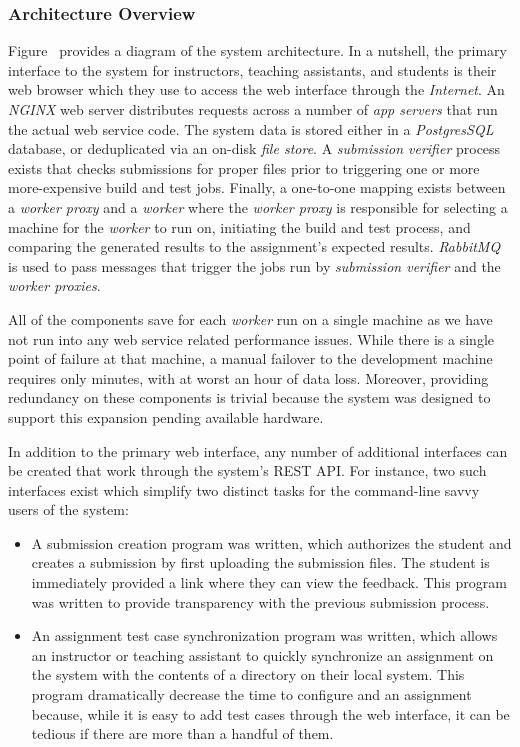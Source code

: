 \subsubsection{Architecture Overview}
Figure~ provides a diagram of the system
architecture. In a nutshell, the primary interface to the system for
instructors, teaching assistants, and students is their web browser which they
use to access the web interface through the \emph{Internet}. An \emph{NGINX}
web server distributes requests across a number of \emph{app servers} that run
the actual web service code. The system data is stored either in a
\emph{PostgresSQL} database, or deduplicated via an on-disk \emph{file
  store}. A \emph{submission verifier} process exists that checks submissions
for proper files prior to triggering one or more more-expensive build and test
jobs. Finally, a one-to-one mapping exists between a \emph{worker proxy} and a
\emph{worker} where the \emph{worker proxy} is responsible for selecting a
machine for the \emph{worker} to run on, initiating the build and test process,
and comparing the generated results to the assignment's expected
results. \emph{RabbitMQ} is used to pass messages that trigger the jobs run by
\emph{submission verifier} and the \emph{worker proxies}.

All of the components save for each \emph{worker} run on a single machine as we
have not run into any web service related performance issues. While there is a
single point of failure at that machine, a manual failover to the development
machine requires only minutes, with at worst an hour of data loss. Moreover,
providing redundancy on these components is trivial because the system was
designed to support this expansion pending available hardware.

In addition to the primary web interface, any number of additional interfaces
can be created that work through the system's REST API. For instance, two such
interfaces exist which simplify two distinct tasks for the command-line savvy
users of the system:

\begin{itemize}
\item A submission creation program was written, which authorizes the student
  and creates a submission by first uploading the submission files. The student
  is immediately provided a link where they can view the feedback. This program
  was written to provide transparency with the previous submission process.
\item An assignment test case synchronization program was written, which allows
  an instructor or teaching assistant to quickly synchronize an assignment on
  the system with the contents of a directory on their local system. This
  program dramatically decrease the time to configure and an assignment
  because, while it is easy to add test cases through the web interface, it can
  be tedious if there are more than a handful of them.
\end{itemize}
